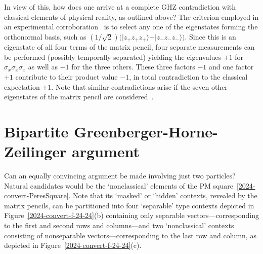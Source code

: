 \documentclass[
  twocolumn,
 showpacs,
 showkeys,
 preprintnumbers,
 amsmath,amssymb,
 aps,
 pra,
  longbibliography,
 floatfix,
 ]{revtex4-2}
\newcommand\myotimes{ }
\begin{document}
In view of this, how does one arrive at a complete GHZ contradiction with classical elements of physical reality, as outlined above?
The criterion employed in an experimental corroboration~\cite{panbdwz} is to select any one of the eigenstates forming the orthonormal basis, such as
$
(1/\sqrt{2})
\big(
\vert z_+z_+z_+ \rangle  + \vert z_-z_-z_- \rangle
\big)
$.
Since this is an eigenstate of all four terms of the matrix pencil, four separate measurements can be performed (possibly temporally separated) yielding the eigenvalues
$+1$ for
$\sigma_x \myotimes  \sigma_x \myotimes  \sigma_x$
as well as $-1$ for the three others. These three factors  $-1$ and one factor $+1$ contribute to their product value $-1$, in total contradiction to the classical expectation $+1$.
Note that similar contradictions arise if the seven other eigenstates of the matrix pencil are considered~\cite[Table~1]{svozil-2020-ghz}.



\section{Bipartite Greenberger-Horne-Zeilinger argument}

Can an equally convincing argument be made involving just two particles?
Natural candidates would be the `nonclassical' elements of the PM square~\eqref{2024-convert-PeresSquare}.
Note that its `masked' or `hidden' contexts, revealed by the matrix pencils, can be partitioned into four `separable' type contexts
depicted in Figure~\ref{2024-convert-f-24-24}(b)
containing only separable vectors---corresponding to the first and second rows and columns---and two `nonclassical' contexts consisting of nonseparable
vectors---corresponding to the last row and column, as depicted in
Figure~\ref{2024-convert-f-24-24}(c).
\end{document}

